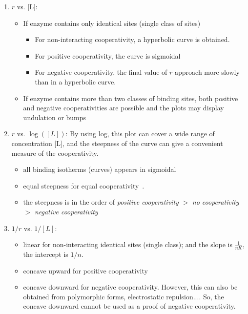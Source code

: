 \begin{enumerate}

\item $r$ vs. [L]: 
  \begin{itemize}
  \item If enzyme contains only identical sites (single class of
    sites)
    \begin{itemize}
    \item For non-interacting cooperativity, a hyperbolic curve is
      obtained.
    \item For positive cooperativity, the curve is sigmoidal
    \item For negative cooperativity, the final value of $r$ approach
      more slowly than in a hyperbolic curve.
    \end{itemize}
  \item If enzyme contains more than two classes of binding sites,
    both positive and negative cooperativities are possible and the
    plots may display undulation or bumps~\citep{teipel1969ipr}
  \end{itemize}

\item $r$ vs. $\log([L])$: By using log, this plot can cover a wide
  range of concentration [L], and the steepness of the curve can give
  a convenient measure of the cooperativity.
  \begin{itemize}
  \item all binding isotherms (curves) appears in sigmoidal
  \item equal steepness for equal
    cooperativity~\citep{koshland1966ceb}.
  \item the steepness is in the order of {\it positive cooperativity}
    $>$ {\it no cooperativity} $>$ {\it negative cooperativity}
  \end{itemize}

\item $1/r$ vs. $1/[L]$:
  \begin{itemize}
  \item linear for non-interacting identical sites (single class); and
    the slope is $\frac{1}{nK}$, the intercept is $1/n$.
  \item concave upward for positive cooperativity 
  \item concave downward for negative cooperativity. However, this can
    also be obtained from polymorphic forms, electrostatic
    repulsion.... So, the concave downward cannot be used as a proof
    of negative cooperativity.
  \end{itemize}


\end{enumerate}
